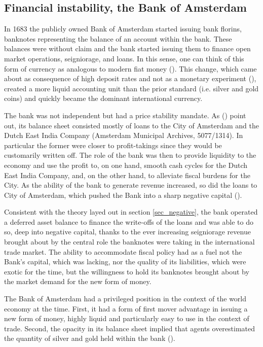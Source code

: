 \documentclass[american]{scrartcl}
\newcommand{\citein}[1]{\citeauthor{#1} (\citeyear{#1})}
\begin{document}
\subsection{Financial instability, the Bank of Amsterdam}

In 1683 the publicly owned Bank of Amsterdam started issuing bank florins, banknotes representing the balance of an account within the bank. These balances were without claim and the bank started issuing them to finance open market operations, seigniorage, and loans. In this sense, one can think of this form of currency as analogous to modern fiat money (\cite[p. 3]{Quinn2014}). This change, which came about as consequence of high deposit rates and not as a monetary experiment (\cite[p. 3]{Quinn2014}), created a more liquid accounting unit than the prior standard (i.e. silver and gold coins) and quickly became the dominant international currency.

The bank was not independent but had a price stability mandate. As \citein{Quinn2014} point out, its balance sheet consisted mostly of loans to the City of Amsterdam and the Dutch East India Company (Amsterdam Municipal Archives, 5077/1314). In particular the former were closer to profit-takings since they would be customarily written off. The role of the bank was then to provide liquidity to the economy and use the profit to, on one hand, smooth cash cycles for the Dutch East India Company, and, on the other hand, to alleviate fiscal burdens for the City. As the ability of the bank to generate revenue increased, so did the loans to City of Amsterdam, which pushed the Bank into a sharp negative capital (\cite[p. 5]{Quinn2014}).

Consistent with the theory layed out in section \ref{sec_negative}, the bank operated a deferred asset balance to finance the write-offs of the loans and was able to do so, deep into negative capital, thanks to the ever increasing seigniorage revenue brought about by the central role the banknotes were taking in the international trade market. The ability to accommodate fiscal policy had as a fuel not the Bank's capital, which was lacking, nor the quality of its liabilities, which were exotic for the time, but the willingness to hold its banknotes brought about by the market demand for the new form of money.

The Bank of Amsterdam had a privileged position in the context of the world economy at the time. First, it had a form of first mover advantage in issuing a new form of money, highly liquid and particularly easy to use in the context of trade. Second, the opacity in its balance sheet implied that agents overestimated the quantity of silver and gold held within the bank (\cite[p. 11]{Quinn2014}).
\end{document}
